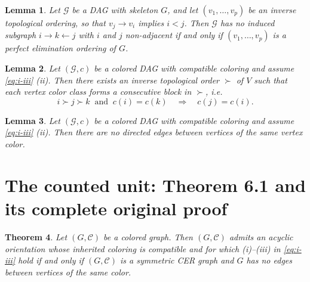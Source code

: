 \documentclass[10pt,a4paper]{amsart}
\newcommand{\1}{\mathbf{1}}
\theoremstyle{plain}
\newtheorem{theorem}{Theorem}
\newtheorem{lemma}[theorem]{Lemma}
\theoremstyle{definition}
\theoremstyle{remark}
\begin{document}
\begin{lemma}\label{lem:revtop_is_peo}
Let $\mathcal G$ be a DAG with skeleton $G$, and let
$(v_1,\ldots,v_p)$ be an inverse topological ordering,
so that $v_j\to v_i$ implies $i<j$.
Then $\mathcal G$ has no induced subgraph
$i\to k\leftarrow j$ with $i$ and $j$ non-adjacent
if and only if $(v_1,\ldots,v_p)$ is a perfect
elimination ordering of $G$.
\end{lemma}


\begin{lemma}\label{lem:cpeoRDAG}
Let $(\mathcal{G},c)$ be a colored DAG with compatible coloring and assume \eqref{eq:i-iii} (ii).
Then there exists an inverse topological order $\succ$ of $V$ such that each vertex color class forms a consecutive block in $\succ$, i.e.
\[
i\succ j\succ k \ \text{ and }\ c(i)=c(k)\quad\Longrightarrow\quad c(j)=c(i).
\]
\end{lemma}


\begin{lemma}\label{lem:no-same-colour-edges}
Let $(\mathcal{G},c)$ be a colored DAG with compatible coloring and assume \eqref{eq:i-iii} (ii).
Then there are no directed edges between vertices of the same vertex color.
\end{lemma}


\section{The counted unit: Theorem 6.1 and its complete original proof}

\begin{theorem}\label{thm:RDAG}
Let $(G,\mathcal C)$ be a colored graph.
Then $(G,\mathcal C)$ admits an acyclic orientation whose inherited
coloring is compatible and for which (i)--(iii) in \eqref{eq:i-iii}
hold if and only if $(G,\mathcal C)$ is a symmetric CER graph and
$G$ has no edges between vertices of the same color.
\end{theorem}
\end{document}
